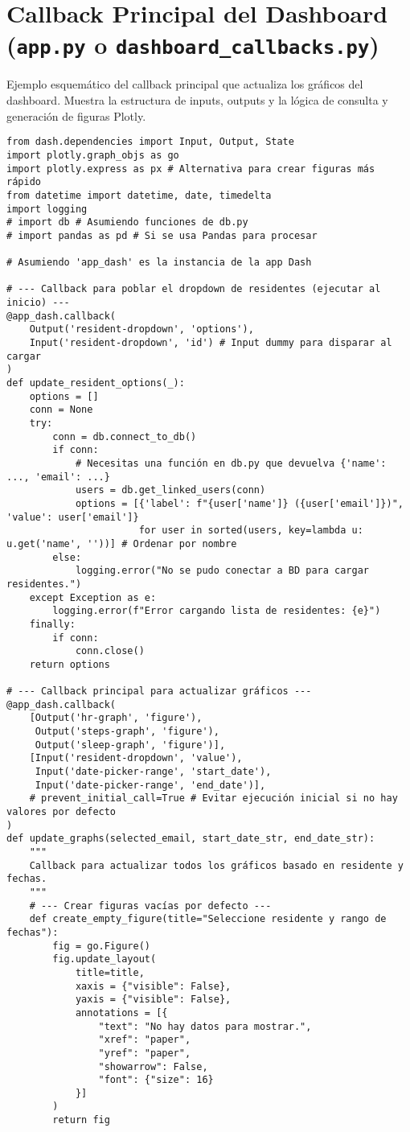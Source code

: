 \section{Callback Principal del Dashboard (\texttt{app.py} o \texttt{dashboard\_callbacks.py})}
\label{annex:code:dash_callback}
Ejemplo esquemático del callback principal que actualiza los gráficos del dashboard. Muestra la estructura de inputs, outputs y la lógica de consulta y generación de figuras Plotly.
\begin{lstlisting}[caption={Ejemplo de callback principal en Dash para actualizar gráficos.}, label={lst:dash_callback_code}]
from dash.dependencies import Input, Output, State
import plotly.graph_objs as go
import plotly.express as px # Alternativa para crear figuras más rápido
from datetime import datetime, date, timedelta
import logging
# import db # Asumiendo funciones de db.py
# import pandas as pd # Si se usa Pandas para procesar

# Asumiendo 'app_dash' es la instancia de la app Dash

# --- Callback para poblar el dropdown de residentes (ejecutar al inicio) ---
@app_dash.callback(
    Output('resident-dropdown', 'options'),
    Input('resident-dropdown', 'id') # Input dummy para disparar al cargar
)
def update_resident_options(_):
    options = []
    conn = None
    try:
        conn = db.connect_to_db()
        if conn:
            # Necesitas una función en db.py que devuelva {'name': ..., 'email': ...}
            users = db.get_linked_users(conn)
            options = [{'label': f"{user['name']} ({user['email']})", 'value': user['email']}
                       for user in sorted(users, key=lambda u: u.get('name', ''))] # Ordenar por nombre
        else:
            logging.error("No se pudo conectar a BD para cargar residentes.")
    except Exception as e:
        logging.error(f"Error cargando lista de residentes: {e}")
    finally:
        if conn:
            conn.close()
    return options

# --- Callback principal para actualizar gráficos ---
@app_dash.callback(
    [Output('hr-graph', 'figure'),
     Output('steps-graph', 'figure'),
     Output('sleep-graph', 'figure')],
    [Input('resident-dropdown', 'value'),
     Input('date-picker-range', 'start_date'),
     Input('date-picker-range', 'end_date')],
    # prevent_initial_call=True # Evitar ejecución inicial si no hay valores por defecto
)
def update_graphs(selected_email, start_date_str, end_date_str):
    """
    Callback para actualizar todos los gráficos basado en residente y fechas.
    """
    # --- Crear figuras vacías por defecto ---
    def create_empty_figure(title="Seleccione residente y rango de fechas"):
        fig = go.Figure()
        fig.update_layout(
            title=title,
            xaxis = {"visible": False},
            yaxis = {"visible": False},
            annotations = [{
                "text": "No hay datos para mostrar.",
                "xref": "paper",
                "yref": "paper",
                "showarrow": False,
                "font": {"size": 16}
            }]
        )
        return fig


\end{lstlisting}
